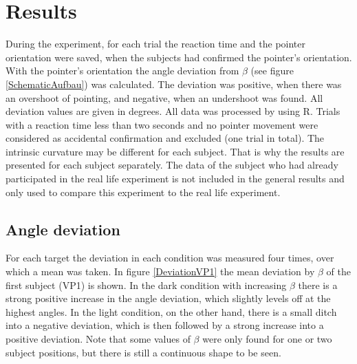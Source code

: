 
\chapter{Results}
\label{Results}
During the experiment, for each trial the reaction time and the pointer orientation were saved, when the subjects had confirmed the pointer's orientation. With the pointer's orientation the angle deviation from $\beta$ (see figure \ref{SchematicAufbau}) was calculated. The deviation was positive, when there was an overshoot of poin\-ting, and negative, when an undershoot was found.
All deviation values are given in degrees. 
All data was processed by using R. %
Trials with a reaction time less than two seconds and no pointer movement were considered as accidental confirmation and excluded (one trial in total). 
The intrinsic curvature may be different for each subject. That is why the results are presented for each subject separately. The data of the subject who had already participated in the real life experiment is not included in the general results and only used to compare this experiment to the real life experiment. 


\section{Angle deviation}
For each target the deviation in each condition was measured four times, over which a mean was taken. In figure \ref{DeviationVP1} the mean deviation by $\beta$  of the first subject (VP1) is shown. In the dark condition with increasing $\beta$ there is a strong positive increase in the angle deviation, which slightly levels off at the highest angles. In the light condition, on the other hand, there is a small ditch into a negative deviation, which is then followed by a strong increase into a positive deviation. Note that some values of $\beta$ were only found for one or two subject positions, but there is still a continuous shape to be seen.


